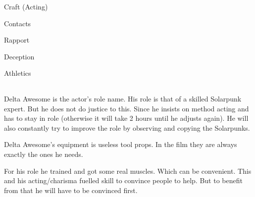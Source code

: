 \begin{npcBox}[title=Delta Awesome]

    \begin{aspects}
    \item {}
    \item {}    
    \item {}    
    \end{aspects}
    
    \begin{skills}
    \item {} Craft (Acting)
    \item {} Contacts
    \item {} Rapport
    \item {} Deception
    \item {} Athletics
    \end{skills}
    
    \begin{stunts}
    \item {}
    \end{stunts}
    
    \begin{stressSection}
    \end{stressSection}
    \begin{tabularx}{\textwidth}{ XX }
    \end{tabularx}
    
    \begin{consequences}
    \item {}
    \item {}
    \item {}
    \end{consequences}
    
    \begin{npcDescription}
    Delta Awesome is the actor's role name. His role is that of a skilled Solarpunk expert. But he
    does not do justice to this. Since he insists on method acting and has to stay in role (otherwise it will take 2 hours until he adjusts again). He will also constantly try to improve the role by observing and copying the Solarpunks.
    
    Delta Awesome's equipment is useless tool props. In the film they are always exactly the ones he needs. 

    For his role he trained and got some real muscles. Which can be convenient. This and his acting/charisma fuelled skill to convince people to help. But to benefit from that he will have to be convinced first.
    \end{npcDescription}
    
\end{npcBox}


